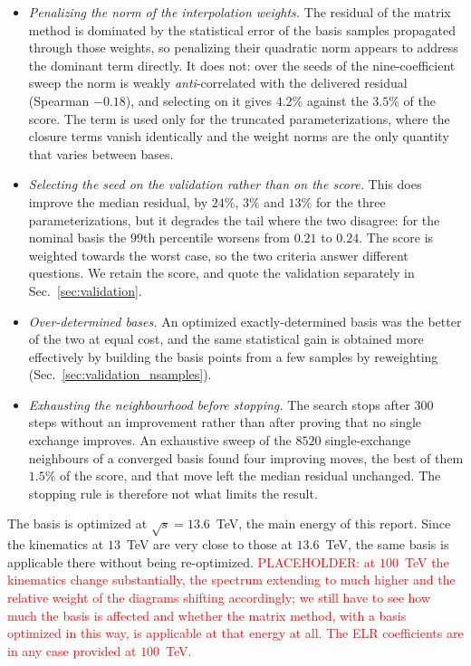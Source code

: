 \begin{itemize}
  \item \emph{Penalizing the norm of the interpolation weights.} The residual of
    the matrix method is dominated by the statistical error of the basis samples
    propagated through those weights, so penalizing their quadratic norm appears
    to address the dominant term directly. It does not: over the seeds of the
    nine-coefficient sweep the norm is weakly \emph{anti}-correlated with the
    delivered residual (Spearman $-0.18$), and selecting on it gives $4.2\%$
    against the $3.5\%$ of the score. The term is used only for the truncated
    parameterizations, where the closure terms vanish identically and the weight
    norms are the only quantity that varies between bases.
  \item \emph{Selecting the seed on the validation rather than on the score.}
    This does improve the median residual, by $24\%$, $3\%$ and $13\%$ for the
    three parameterizations, but it degrades the tail where the two disagree: for
    the nominal basis the $99$th percentile worsens from $0.21$ to $0.24$. The
    score is weighted towards the worst case, so the two criteria answer different
    questions. We retain the score, and quote the validation separately in
    Sec.~\ref{sec:validation}.
  \item \emph{Over-determined bases.} An optimized exactly-determined basis was the
    better of the two at equal cost, and the same statistical gain is obtained more
    effectively by building the basis points from a few samples by reweighting
    (Sec.~\ref{sec:validation_nsamples}).
  \item \emph{Exhausting the neighbourhood before stopping.} The search stops
    after $300$ steps without an improvement rather than after proving that no
    single exchange improves. An exhaustive sweep of the $8520$ single-exchange
    neighbours of a converged basis found four improving moves, the best of them
    $1.5\%$ of the score, and that move left the median residual unchanged.
    The stopping rule is therefore not what limits the result.
\end{itemize}

The basis is optimized at $\sqrt{s}=13.6$~TeV, the main energy of this report. Since the \ggHH kinematics at $13$~TeV are very close to those at $13.6$~TeV, the same basis is applicable there without being re-optimized. \textcolor{red}{PLACEHOLDER: at $100$~TeV the kinematics change substantially, the spectrum extending to much higher \mHH and the relative weight of the diagrams shifting accordingly; we still have to see how much the basis is affected and whether the matrix method, with a basis optimized in this way, is applicable at that energy at all. The ELR coefficients are in any case provided at $100$~TeV.}

